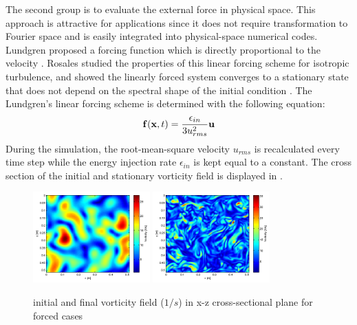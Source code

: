 The second group is to evaluate the external force in physical space. This approach is attractive for applications since it does not require transformation to Fourier space and is easily integrated into physical-space numerical codes. Lundgren proposed a forcing function which is directly proportional to the velocity \cite{Lundgren2003Linearly}. Rosales studied the properties of this linear forcing scheme for isotropic turbulence, and showed the linearly forced system converges to a stationary state that does not depend on the spectral shape of the initial condition \cite{Rosales2005Linear}. The Lundgren's linear forcing scheme is determined with the following equation:
\begin{equation}
\mathbf{f}(\mathbf{x}, t) = \frac{\epsilon_{in}}{3u_{rms}^2}\mathbf{u}
\end{equation}
During the simulation, the root-mean-square velocity $u_{rms}$ is recalculated every time step while the energy injection rate $\epsilon_{in}$ is kept equal to a constant.
The cross section of the initial and stationary vorticity field is displayed in .

\begin{figure}[h]\centering
\includegraphics[width=0.4\textwidth]{Figures/vortex-0}
\includegraphics[width=0.4\textwidth]{Figures/vortex-1}

\caption{initial and final vorticity field ($1/s$) in x-z cross-sectional
plane for forced cases\label{fig:vort}}
\end{figure}